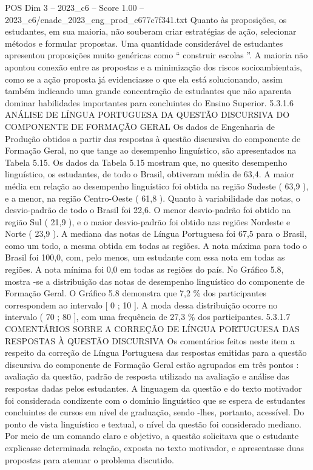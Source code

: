 \begin{textsample}{POS Dim 3 – 2023\_c6 – Score 1.00 – 2023\_c6/enade\_2023\_eng\_prod\_c677c7f341.txt}
Quanto às proposições, os estudantes, em sua maioria, não souberam criar estratégias de ação, selecionar métodos e formular propostas.
Uma quantidade considerável de estudantes apresentou proposições muito genéricas como “ construir escolas ”.
A maioria não apontou conexão entre as propostas e a minimização dos riscos socioambientais, como se a ação proposta já evidenciasse o que ela está solucionando, assim também indicando uma grande concentração de estudantes que não aparenta dominar habilidades importantes para concluintes do Ensino Superior. 5.3.1.6 ANÁLISE DE LÍNGUA PORTUGUESA DA QUESTÃO DISCURSIVA DO COMPONENTE DE FORMAÇÃO GERAL Os dados de Engenharia de Produção obtidos a partir das respostas à questão discursiva do componente de Formação Geral, no que tange ao desempenho linguístico, são apresentados na Tabela 5.15.
Os dados da Tabela 5.15 mostram que, no quesito desempenho linguístico, os estudantes, de todo o Brasil, obtiveram média de 63,4.
A maior média em relação ao desempenho linguístico foi obtida na região Sudeste ( 63,9 ), e a menor, na região Centro-Oeste ( 61,8 ).
Quanto à variabilidade das notas, o desvio-padrão de todo o Brasil foi 22,6.
O menor desvio-padrão foi obtido na região Sul ( 21,9 ), e o maior desvio-padrão foi obtido nas regiões Nordeste e Norte ( 23,9 ).
A mediana das notas de Língua Portuguesa foi 67,5 para o Brasil, como um todo, a mesma obtida em todas as regiões.
A nota máxima para todo o Brasil foi 100,0, com, pelo menos, um estudante com essa nota em todas as regiões.
A nota mínima foi 0,0 em todas as regiões do país.
No Gráfico 5.8, mostra -se a distribuição das notas de desempenho linguístico do componente de Formação Geral.
O Gráfico 5.8 demonstra que 7,2 \% dos participantes correspondem ao intervalo [ 0 ; 10 ].
A moda dessa distribuição ocorre no intervalo ( 70 ; 80 ], com uma frequência de 27,3 \% dos participantes. 5.3.1.7 COMENTÁRIOS SOBRE A CORREÇÃO DE LÍNGUA PORTUGUESA DAS RESPOSTAS À QUESTÃO DISCURSIVA Os comentários feitos neste item a respeito da correção de Língua Portuguesa das respostas emitidas para a questão discursiva do componente de Formação Geral estão agrupados em três pontos : avaliação da questão, padrão de resposta utilizado na avaliação e análise das respostas dadas pelos estudantes.
A linguagem da questão e do texto motivador foi considerada condizente com o domínio linguístico que se espera de estudantes concluintes de cursos em nível de graduação, sendo -lhes, portanto, acessível.
Do ponto de vista linguístico e textual, o nível da questão foi considerado mediano.
Por meio de um comando claro e objetivo, a questão solicitava que o estudante explicasse determinada relação, exposta no texto motivador, e apresentasse duas propostas para atenuar o problema discutido.

\end{textsample}
